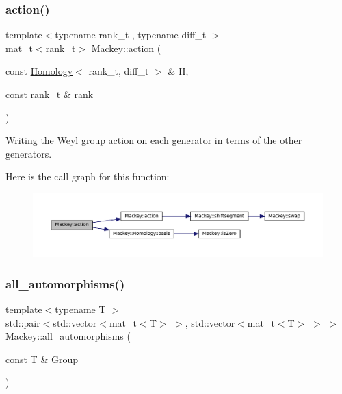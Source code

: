 \subsubsection{\texorpdfstring{action()}{action()}\hspace{0.1cm}{\footnotesize\ttfamily [2/2]}}
{\footnotesize\ttfamily template$<$typename rank\+\_\+t , typename diff\+\_\+t $>$ \\
\hyperlink{namespaceMackey_a035386035757dade630f685e508e5cf9}{mat\+\_\+t}$<$rank\+\_\+t$>$ Mackey\+::action (\begin{DoxyParamCaption}\item[{const \hyperlink{classMackey_1_1Homology}{Homology}$<$ rank\+\_\+t, diff\+\_\+t $>$ \&}]{H,  }\item[{const rank\+\_\+t \&}]{rank }\end{DoxyParamCaption})}



Writing the Weyl group action on each generator in terms of the other generators. 

Here is the call graph for this function\+:\nopagebreak
\begin{figure}[H]
\begin{center}
\leavevmode
\includegraphics[width=350pt]{namespaceMackey_aaa66c9857ba86a13949d1b1825ea20f7_cgraph}
\end{center}
\end{figure}
\mbox{\label{namespaceMackey_a2556e2a1f78783585df78de1c1b35eae}} 
\subsubsection{\texorpdfstring{all\+\_\+automorphisms()}{all\_automorphisms()}}
{\footnotesize\ttfamily template$<$typename T $>$ \\
std\+::pair$<$std\+::vector$<$\hyperlink{namespaceMackey_a035386035757dade630f685e508e5cf9}{mat\+\_\+t}$<$T$>$ $>$, std\+::vector$<$\hyperlink{namespaceMackey_a035386035757dade630f685e508e5cf9}{mat\+\_\+t}$<$T$>$ $>$ $>$ Mackey\+::all\+\_\+automorphisms (\begin{DoxyParamCaption}\item[{const T \&}]{Group }\end{DoxyParamCaption})}

